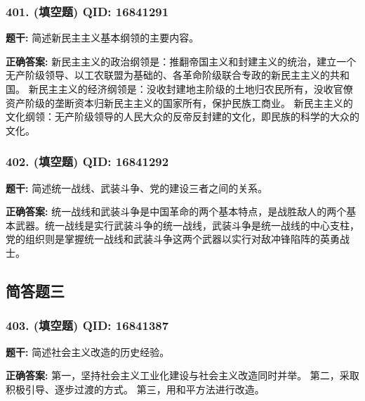 \documentclass[12pt,UTF8]{ctexart}
\begin{document}
\vspace{0.3em}\hrulefill\vspace{0.7em}

\subsubsection*{401. (填空题) \small QID: 16841291}

\textbf{题干:}
简述新民主主义基本纲领的主要内容。

\textbf{正确答案:}
新民主主义的政治纲领是：推翻帝国主义和封建主义的统治，建立一个无产阶级领导、以工农联盟为基础的、各革命阶级联合专政的新民主主义的共和国。
新民主主义的经济纲领是：没收封建地主阶级的土地归农民所有，没收官僚资产阶级的垄断资本归新民主主义的国家所有，保护民族工商业。
新民主主义的文化纲领：无产阶级领导的人民大众的反帝反封建的文化，即民族的科学的大众的文化。

\vspace{0.3em}\hrulefill\vspace{0.7em}

\subsubsection*{402. (填空题) \small QID: 16841292}

\textbf{题干:}
简述统一战线、武装斗争、党的建设三者之间的关系。

\textbf{正确答案:}
统一战线和武装斗争是中国革命的两个基本特点，是战胜敌人的两个基本武器。统一战线是实行武装斗争的统一战线，武装斗争是统一战线的中心支柱，党的组织则是掌握统一战线和武装斗争这两个武器以实行对敌冲锋陷阵的英勇战士。

\vspace{0.3em}\hrulefill\vspace{0.7em}

\subsection*{简答题三}

\subsubsection*{403. (填空题) \small QID: 16841387}

\textbf{题干:}
简述社会主义改造的历史经验。

\textbf{正确答案:}
第一，坚持社会主义工业化建设与社会主义改造同时并举。
第二，采取积极引导、逐步过渡的方式。
第三，用和平方法进行改造。
\end{document}
